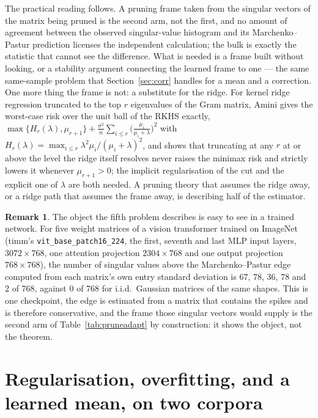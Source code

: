 \documentclass[11pt]{article}
\theoremstyle{definition}
\newtheorem{remark}[theorem]{Remark}
\begin{document}
The practical reading follows. A pruning frame taken from the singular vectors of the matrix being
pruned is the second arm, not the first, and no amount of agreement between the observed
singular-value histogram and its Marchenko--Pastur prediction licenses the independent calculation;
the bulk is exactly the statistic that cannot see the difference. What is needed is a frame built
without looking, or a stability argument connecting the learned frame to one --- the same
same-sample problem that Section~\ref{sec:corr} handles for a mean and a correction. One more thing
the frame is not: a substitute for the ridge. For kernel ridge regression truncated to the top $r$
eigenvalues of the Gram matrix, Amini \cite{Amini} gives the worst-case risk over the unit ball of
the RKHS exactly,
$\max\{H_r(\lambda),\mu_{r+1}\}+\frac{\sigma^2}{n}\sum_{i\le r}\big(\frac{\mu_i}{\mu_i+\lambda}\big)^2$
with $H_r(\lambda)=\max_{i\le r}\lambda^2\mu_i/(\mu_i+\lambda)^2$, and shows that truncating at any
$r$ at or above the level the ridge itself resolves never raises the minimax risk and strictly
lowers it whenever $\mu_{r+1}>0$; the implicit regularisation of the cut and the explicit one of
$\lambda$ are both needed. A pruning theory that assumes the ridge away, or a ridge path that assumes
the frame away, is describing half of the estimator.

\begin{remark}
The object the fifth problem describes is easy to see in a trained network. For five weight matrices
of a vision transformer trained on ImageNet (timm's \texttt{vit\_base\_patch16\_224}, the first,
seventh and last MLP input layers, $3072\times768$, one attention projection $2304\times768$ and one
output projection $768\times768$), the number of singular values above the Marchenko--Pastur edge
computed from each matrix's own entry standard deviation is $67$, $78$, $36$, $78$ and $2$ of $768$,
against $0$ of $768$ for i.i.d.\ Gaussian matrices of the same shapes. This is one checkpoint, the
edge is estimated from a matrix that contains the spikes and is therefore conservative, and the frame
those singular vectors would supply is the second arm of Table~\ref{tab:pruneadapt} by construction:
it shows the object, not the theorem.
\end{remark}



\section{Regularisation, overfitting, and a learned mean, on two corpora}\label{sec:reg}
\end{document}
